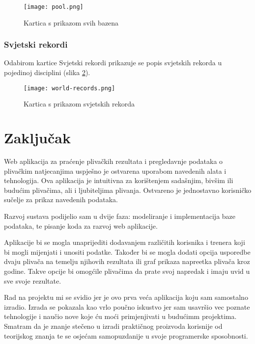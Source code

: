 \documentclass[times, utf8, zavrsni]{fer}
\begin{document}
\begin{figure}[!h]
    \centering
    \texttt{[image: pool.png]}
    \centering
    \caption{Kartica s prikazom svih bazena}
    \label{fig:pool}
\end{figure}

\subsection{Svjetski rekordi}
Odabirom kartice Svjetski rekordi prikazuje se popis svjetskih rekorda u pojedinoj disciplini (slika \ref*{fig:world-records}).

\begin{figure}[!h]
    \centering
    \texttt{[image: world-records.png]}
    \centering
    \caption{Kartica s prikazom svjetskih rekorda}
    \label{fig:world-records}
\end{figure}

\chapter{Zaključak}
Web aplikacija za praćenje plivačkih rezultata i pregledavnje podataka o plivačkim natjecanjima uspješno je ostvarena
uporabom navedenih alata i tehnologija. Ova aplikacija je intuitivna za korištenjem sadašnjim, bivšim ili budućim
plivačima, ali i ljubiteljima plivanja. Ostvareno je jednostavno korisničko sučelje za prikaz navedenih podataka.

\vspace{\baselineskip}

Razvoj sustava podijelio sam u dvije faza: modeliranje i implementacija baze podataka, te pisanje koda za
razvoj web aplikacije. 

\vspace{\baselineskip}

Aplikacije bi se mogla unaprijediti dodavanjem različitih korisnika i trenera koji bi mogli mijenjati i unositi podatke.
Također bi se mogla dodati opcija usporedbe dvaju plivača na temelju njihovih rezultata ili graf prikaza napreetka
plivača kroz godine. Takve opcije bi omogćile plivačima da prate svoj napredak i imaju uvid u sve svoje rezultate.

\vspace{\baselineskip}

Rad na projektu mi se svidio jer je ovo prva veća aplikacija koju sam samostalno izradio. Izrada se pokazala kao vrlo
poučno iskustvo jer sam usavršio vec poznate tehnologije i naučio nove koje ću moći primjenjivati u budućimm projektima.
Smatram da je znanje stečeno u izradi praktičnog proizvoda korisnije od teorijskog znanja te se osjećam samopuzdanije u svoje
programerske sposobnosti. 
\end{document}
